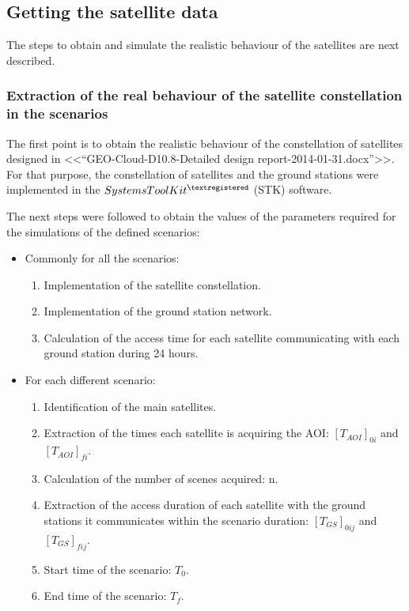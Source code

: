 \subsection{Getting the satellite data}
\label{subsec:getting-satellite-data}

The steps to obtain and simulate the realistic behaviour of the satellites are
next described. 


\subsubsection{Extraction of the real behaviour of the satellite constellation
  in the scenarios}
\label{subsubsec:extraction}

The first point is to obtain the realistic behaviour of the constellation of satellites designed in <<“GEO-Cloud-D10.8-Detailed design report-2014-01-31.docx”>>.  For that purpose, the constellation of satellites and the ground stations were implemented in the \emph{$Systems Tool Kit^{\textregistered}$} (STK) software.

The next steps were followed to obtain the values of the parameters required for the simulations of the defined scenarios:
\begin{itemize}
\item Commonly for all the scenarios:
\begin{enumerate}
\item Implementation of the satellite constellation.
\item Implementation of the ground station network.
\item Calculation of the access time for each satellite communicating with each
  ground station during 24 hours.
\setcounter{enumTemp}{\theenumi}
\end{enumerate}
\item For each different scenario:
\begin{enumerate}
\setcounter{enumi}{\theenumTemp}
\item Identification of the main satellites.
\item Extraction of the times each satellite is acquiring the AOI: $[T_{AOI}]_{0i}$ and $[T_{AOI}]_{fi}$.
\item Calculation of the number of scenes acquired: n.
\item Extraction of the access duration of each satellite with the ground stations it communicates within the scenario duration: $[T_{GS}]_{0ij}$ and $[T_{GS}]_{fij}$.
\item Start time of the scenario: $T_0$.
\item End time of the scenario: $T_f$.
\end{enumerate}
\end{itemize}

